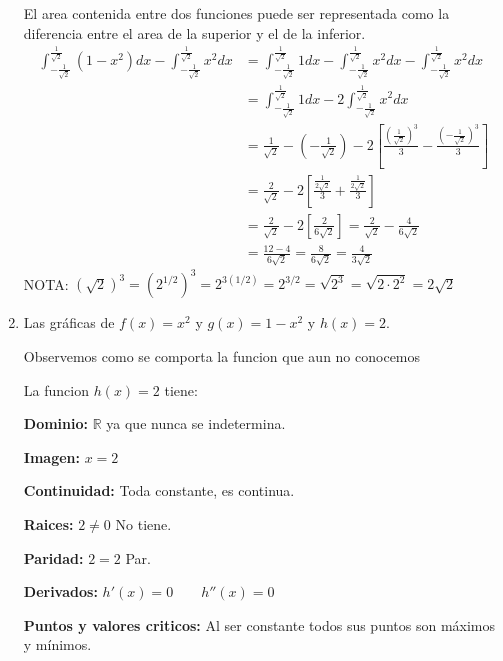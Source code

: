 \documentclass[12pt]{article}
\begin{document}
\begin{enumerate}[\hspace{9px} a)]
        El area contenida entre dos funciones puede ser representada como la diferencia entre el area de la superior y el de la inferior.\medskip
        \begin{align*}
            \int_{-\frac{1}{\sqrt{2}}}^{\frac{1}{\sqrt{2}}}(1-x^2)dx - \int_{-\frac{1}{\sqrt{2}}}^{\frac{1}{\sqrt{2}}} x^2dx &= \int_{-\frac{1}{\sqrt{2}}}^{\frac{1}{\sqrt{2}}} 1dx - \int_{-\frac{1}{\sqrt{2}}}^{\frac{1}{\sqrt{2}}} x^2dx - \int_{-\frac{1}{\sqrt{2}}}^{\frac{1}{\sqrt{2}}} x^2dx\\
            &= \int_{-\frac{1}{\sqrt{2}}}^{\frac{1}{\sqrt{2}}} 1dx - 2\int_{-\frac{1}{\sqrt{2}}}^{\frac{1}{\sqrt{2}}} x^2dx\\
            &= \frac{1}{\sqrt{2}}-\left(-\frac{1}{\sqrt{2}}\right) - 2\left[\frac{\left(\frac{1}{\sqrt{2}}\right)^3}{3}-\frac{\left(-\frac{1}{\sqrt{2}}\right)^3}{3}\right]\\
            &= \frac{2}{\sqrt{2}} - 2\left[\frac{\frac{1}{2\sqrt{2}}}{3}+\frac{\frac{1}{2\sqrt{2}}}{3}\right]\\
            &= \frac{2}{\sqrt{2}} - 2\left[\frac{2}{6\sqrt{2}}\right] = \frac{2}{\sqrt{2}} - \frac{4}{6\sqrt{2}}\\
            &= \frac{12-4}{6\sqrt{2}} = \frac{8}{6\sqrt{2}} = \frac{4}{3\sqrt{2}}
        \end{align*}
        NOTA: \((\sqrt{2})^3 = (2^{1/2})^3 = 2^{3(1/2)} = 2^{3/2} = \sqrt{2^3} = \sqrt{2\cdot2^2} = 2\sqrt{2}\)\medskip

    \item Las gr\'aficas de \(f(x)=x^2\) y \(g(x)=1-x^2\) y \(h(x)=2\).\medskip
    
        Observemos como se comporta la funcion que aun no conocemos\medskip

        La funcion \(h(x)=2\) tiene:\bigskip

        \textbf{Dominio: }\(\mathbb{R}\) ya que nunca se indetermina.\medskip
        
        \textbf{Imagen: } \(x=2\)\medskip

        \textbf{Continuidad: }Toda constante, es continua.\medskip

        \textbf{Raices: }\(2\neq0\) No tiene.\medskip
        
        \textbf{Paridad: }\(2=2\) Par.\medskip

        \textbf{Derivados: }\(h'(x)=0 \qquad h''(x)=0\)\medskip
        
        \textbf{Puntos y valores criticos: } Al ser constante todos sus puntos son m\'aximos y m\'inimos.\medskip
        

\end{enumerate}
\end{document}
